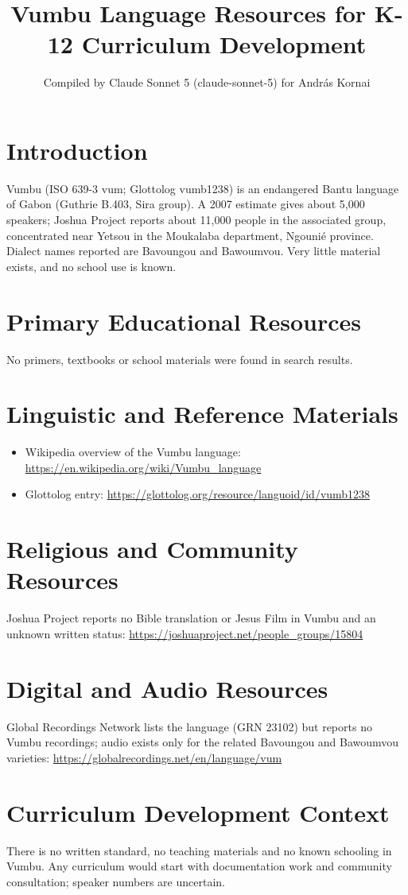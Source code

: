 \documentclass[12pt]{article}
\title{Vumbu Language Resources for K-12 Curriculum Development}
\author{Compiled by Claude Sonnet 5 (claude-sonnet-5) for Andr\'as Kornai}
\date{}
\begin{document}
\maketitle
\section{Introduction}
Vumbu (ISO 639-3 vum; Glottolog vumb1238) is an endangered Bantu language of Gabon (Guthrie B.403, Sira group). A 2007 estimate gives about 5,000 speakers; Joshua Project reports about 11,000 people in the associated group, concentrated near Yetsou in the Moukalaba department, Ngouni\'e province. Dialect names reported are Bavoungou and Bawoumvou. Very little material exists, and no school use is known.
\section{Primary Educational Resources}
No primers, textbooks or school materials were found in search results.
\section{Linguistic and Reference Materials}
\begin{itemize}
\item Wikipedia overview of the Vumbu language: \url{https://en.wikipedia.org/wiki/Vumbu_language}
\item Glottolog entry: \url{https://glottolog.org/resource/languoid/id/vumb1238}
\end{itemize}
\section{Religious and Community Resources}
Joshua Project reports no Bible translation or Jesus Film in Vumbu and an unknown written status: \url{https://joshuaproject.net/people_groups/15804}
\section{Digital and Audio Resources}
Global Recordings Network lists the language (GRN 23102) but reports no Vumbu recordings; audio exists only for the related Bavoungou and Bawoumvou varieties: \url{https://globalrecordings.net/en/language/vum}
\section{Curriculum Development Context}
There is no written standard, no teaching materials and no known schooling in Vumbu. Any curriculum would start with documentation work and community consultation; speaker numbers are uncertain.
\end{document}
